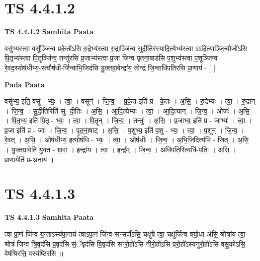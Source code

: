 \documentclass[17pt]{extarticle}
\begin{document}
\section*{ TS 4.4.1.2 }

\textbf{TS 4.4.1.2 } \newline
\textbf{Samhita Paata} \newline

वसु॑भ्यस्त्वा॒ वसू᳚ञ्जिन्व प्रके॒तो॑ऽसि रु॒द्रेभ्य॑स्त्वा रु॒द्राञ्जि॑न्व सुदी॒तिर॑स्यादि॒त्येभ्य॑स्त्वा ऽऽदि॒त्याञ्जि॒न्वौजो॑ऽसि पि॒तृभ्य॑स्त्वा पि॒तॄञ्जि॑न्व॒ तन्तु॑रसि प्र॒जाभ्य॑स्त्वा प्र॒जा जि॑न्व पृतना॒षाड॑सि प॒शुभ्य॑स्त्वा प॒शूञ्जि॑न्व रे॒वद॒स्योष॑धीभ्य॒-स्त्वौष॑धी-र्जिन्वाभि॒जिद॑सि यु॒क्तग्रा॒वेन्द्रा॑य॒ त्वेन्द्रं॑ जि॒न्वाधि॑पतिरसि प्रा॒णाय॑ - [  ] \newline

\textbf{Pada Paata} \newline

वसु॑भ्य॒ इति॒ वसु॑ - भ्यः॒ । त्वा॒ । वसून्॑ । जि॒न्व॒ । प्र॒के॒त इति॑ प्र - के॒तः । अ॒सि॒ । रु॒द्रेभ्यः॑ । त्वा॒ । रु॒द्रान् । जि॒न्व॒ । सु॒दी॒तिरिति॑ सु- दी॒तिः । अ॒सि॒ । आ॒दि॒त्येभ्यः॑ । त्वा॒ । आ॒दि॒त्यान् । जि॒न्व॒ । ओजः॑ । अ॒सि॒ । पि॒तृभ्य॒ इति॑ पि॒तृ - भ्यः॒ । त्वा॒ । पि॒तॄन् । जि॒न्व॒ । तन्तुः॑ । अ॒सि॒ । प्र॒जाभ्य॒ इति॑ प्र - जाभ्यः॑ । त्वा॒ । प्र॒जा इति॑ प्र - जाः । जि॒न्व॒ । पृ॒त॒ना॒षाट् । अ॒सि॒ । प॒शुभ्य॒ इति॑ प॒शु - भ्यः॒ । त्वा॒ । प॒शून् । जि॒न्व॒ । रे॒वत् । अ॒सि॒ । ओष॑धीभ्य॒ इत्योष॑धि - भ्यः॒ । त्वा॒ । ओष॑धीः । जि॒न्व॒ । अ॒भि॒जिदित्य॑भि - जित् । अ॒सि॒ । यु॒क्तग्रा॒वेति॑ यु॒क्त - ग्रा॒वा॒ । इन्द्रा॑य । त्वा॒ । इन्द्र᳚म् । जि॒न्व॒ । अधि॑पति॒रित्यधि॑-प॒तिः॒ । अ॒सि॒ । प्रा॒णायेति॑ प्र-अ॒नाय॑ ।  \newline




\section*{ TS 4.4.1.3 }

\textbf{TS 4.4.1.3 } \newline
\textbf{Samhita Paata} \newline

त्वा प्रा॒णं जि॑न्व य॒न्ताऽस्य॑पा॒नाय॑ त्वाऽपा॒नं जि॑न्व सꣳ॒॒सर्पो॑ऽसि॒ चक्षु॑षे त्वा॒ चक्षु॑र्जिन्व वयो॒धा अ॑सि॒ श्रोत्रा॑य त्वा॒ श्रोत्रं॑ जिन्व त्रि॒वृद॑सि प्र॒वृद॑सि सं॒ॅवृद॑सि वि॒वृद॑सि सꣳरो॒हो॑ऽसि नीरो॒हो॑ऽसि प्ररो॒हो᳚ऽस्यनुरो॒हो॑ऽसि वसु॒को॑ऽसि॒ वेष॑श्रिरसि॒ वस्य॑ष्टिरसि ॥ \newline
\end{document}
